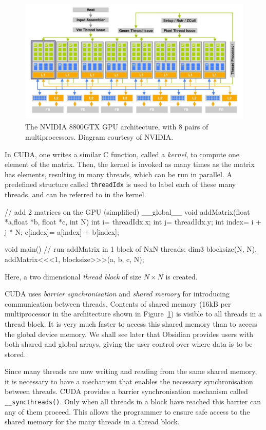\begin{figure}%
\begin{center}
\includegraphics[height = 6cm]{./ifl/image_top.pdf}
\caption{The NVIDIA 8800GTX GPU architecture, with 8 pairs of multiprocessors. Diagram courtesy of NVIDIA.}\label{fig:image}
\end{center}
\end{figure}


\noindent In CUDA, one writes a similar C function, called a {\em kernel},
to compute one element of the matrix. Then, the kernel is invoked as many
times as the matrix has elements, resulting in many threads, which can be
run in parallel. A predefined structure called {\tt threadIdx} is used to
label each of these many threads, and can be referred to in the kernel.
\begin{code}
// add 2 matrices on the GPU (simplified)
__global__ void addMatrix(float *a,float *b, float *c, int N)
{
  int i= threadIdx.x;
  int j= threadIdx.y;
  int index= i + j * N;
  c[index]= a[index] + b[index];
}

void main()
{
  // run addMatrix in 1 block of NxN threads:
  dim3 blocksize(N, N),
  addMatrix<<<1, blocksize>>>(a, b, c, N);
}
\end{code}
Here, a two dimensional {\em thread block} of size $N \times N$ is created.

CUDA uses {\em barrier synchronisation} and {\em shared memory} for
introducing communication between threads. Contents of shared memory (16kB
per multiprocessor in the architecture shown in Figure~\ref{fig:image}) is
visible to all threads in a thread block. It is very much faster to access
this shared memory than to access the global device memory. We shall see
later that Obsidian provides users with both shared and global arrays,
giving the user control over where data is to be stored.

Since many threads are now writing and reading from the same shared memory,
it is necessary to have a mechanism that enables the necessary
synchronisation between threads. CUDA provides a barrier synchronisation
mechanism called {\tt \_\_syncthreads()}. Only when all threads in a block
have reached this barrier can any of them proceed. This allows the
programmer to ensure safe access to the shared memory for the many threads
in a thread block.

